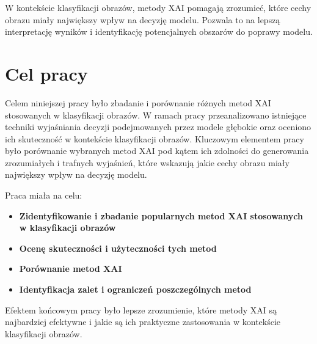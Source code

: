 W kontekście klasyfikacji obrazów, metody XAI pomagają zrozumieć, które cechy obrazu miały największy wpływ na decyzję modelu.
Pozwala to na lepszą interpretację wyników i identyfikację potencjalnych obszarów do poprawy modelu.

\section*{Cel pracy}
Celem niniejszej pracy było zbadanie i porównanie różnych metod XAI stosowanych w klasyfikacji obrazów.
W ramach pracy przeanalizowano istniejące techniki wyjaśniania decyzji podejmowanych przez modele głębokie oraz oceniono ich skuteczność w kontekście klasyfikacji obrazów.
Kluczowym elementem pracy było porównanie wybranych metod XAI pod kątem ich zdolności do generowania zrozumiałych i trafnych wyjaśnień, które wskazują jakie cechy obrazu miały największy wpływ na decyzję modelu.

Praca miała na celu:
\begin{itemize}
	\item \textbf{Zidentyfikowanie i zbadanie popularnych metod XAI stosowanych w klasyfikacji obrazów}
	\item \textbf{Ocenę skuteczności i użyteczności tych metod}
	\item \textbf{Porównanie metod XAI}
	\item \textbf{Identyfikacja zalet i ograniczeń poszczególnych metod}
\end{itemize}

Efektem końcowym pracy było lepsze zrozumienie, które metody XAI są najbardziej efektywne i jakie są ich praktyczne zastosowania w kontekście klasyfikacji obrazów.

